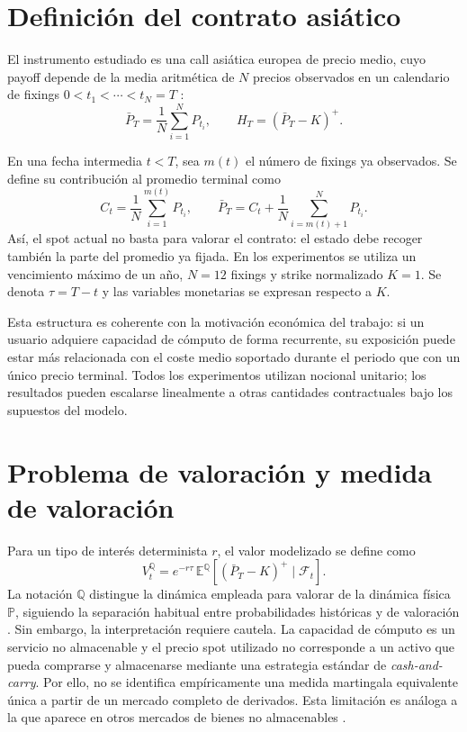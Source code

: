 \section{Definición del contrato asiático}
\label{sec:contrato_asiatico}

El instrumento estudiado es una call asiática europea de precio medio, cuyo
payoff depende de la media aritmética de $N$ precios observados en un calendario
de fixings $0<t_1<\cdots<t_N=T$ \parencite{kemna_vorst_1990,turnbull_wakeman_1991}:
\begin{equation}
    \bar P_T=\frac{1}{N}\sum_{i=1}^{N}P_{t_i},
    \qquad
    H_T=(\bar P_T-K)^+ .
    \label{eq:asian_payoff}
\end{equation}

En una fecha intermedia $t<T$, sea $m(t)$ el número de fixings ya observados. Se
define su contribución al promedio terminal como
\begin{equation}
    C_t=\frac{1}{N}\sum_{i=1}^{m(t)}P_{t_i},
    \qquad
    \bar P_T=C_t+\frac{1}{N}\sum_{i=m(t)+1}^{N}P_{t_i}.
    \label{eq:asian_average_decomposition}
\end{equation}
Así, el spot actual no basta para valorar el contrato: el estado debe recoger
también la parte del promedio ya fijada. En los experimentos se utiliza un
vencimiento máximo de un año, $N=12$ fixings y strike normalizado $K=1$. Se
denota $\tau=T-t$ y las variables monetarias se expresan respecto a $K$.

Esta estructura es coherente con la motivación económica del trabajo: si un
usuario adquiere capacidad de cómputo de forma recurrente, su exposición puede
estar más relacionada con el coste medio soportado durante el periodo que con un
único precio terminal. Todos los experimentos utilizan nocional unitario; los
resultados pueden escalarse linealmente a otras cantidades contractuales bajo los
supuestos del modelo.


\section{Problema de valoración y medida de valoración}
\label{sec:medida_q}

Para un tipo de interés determinista $r$, el valor modelizado se define como
\begin{equation}
    V_t^{\mathbb Q}
    =e^{-r\tau}\,
    \mathbb E^{\mathbb Q}
    \left[(\bar P_T-K)^+\mid\mathcal F_t\right].
    \label{eq:asian_pricing_q}
\end{equation}
La notación $\mathbb Q$ distingue la dinámica empleada para valorar de la
dinámica física $\mathbb P$, siguiendo la separación habitual entre
probabilidades históricas y de valoración \parencite{uned_mod7_2026}. Sin
embargo, la interpretación requiere cautela. La capacidad de cómputo es un
servicio no almacenable y el precio spot utilizado no corresponde a un activo
que pueda comprarse y almacenarse mediante una estrategia estándar de
\textit{cash-and-carry}. Por ello, no se identifica empíricamente una medida
martingala equivalente única a partir de un mercado completo de derivados. Esta
limitación es análoga a la que aparece en otros mercados de bienes no
almacenables \parencite{bessembinder_lemmon_2002,bandi_su_2026}.

